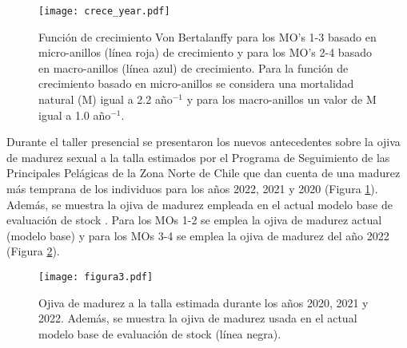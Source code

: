 \begin{figure}[H]
    \centering
    \texttt{[image: crece\_year.pdf]}
    \caption{Función de crecimiento Von Bertalanffy para los MO's 1-3 basado en micro-anillos (línea roja)
    de crecimiento y para los MO's 2-4 basado en macro-anillos (línea azul) de crecimiento. Para la función
    de crecimiento basado en micro-anillos se considera una mortalidad natural (M) igual a 2.2 año$^{-1}$ y para
    los macro-anillos un valor de M igual a 1.0 año$^{-1}$. }
    \label{fig:crece_year}
\end{figure}

Durante el taller presencial se presentaron los nuevos antecedentes sobre la ojiva de madurez sexual a la talla estimados por el Programa de Seguimiento de las Principales Pelágicas de la Zona Norte de Chile \citep{Hernandez2023} que dan cuenta de una madurez más temprana de los individuos para los años 2022, 2021 y 2020 (Figura \ref{fig:crece_year}). Además, se muestra la ojiva de madurez empleada en el actual modelo base de evaluación de stock \citep{martinez2009}. Para los MOs 1-2 se emplea la ojiva de madurez
actual (modelo base) y para los MOs 3-4 se emplea la ojiva de madurez del año 2022 (Figura \ref{fig:figura3}).

\begin{figure}[H]
    \centering
    \texttt{[image: figura3.pdf]}
    \caption{Ojiva de madurez a la talla estimada durante los años 2020, 2021 y 2022. Además, se muestra la ojiva de madurez usada en el actual modelo base de evaluación de stock (línea negra). }
    \label{fig:figura3}
\end{figure}